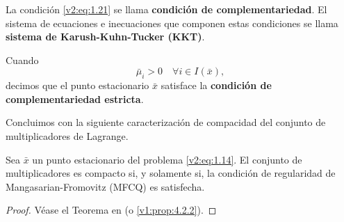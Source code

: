 La condición \eqref{v2:eq:1.21} se llama \textbf{condición de complementariedad}. El sistema de ecuaciones e inecuaciones que componen estas condiciones se llama \textbf{sistema de Karush-Kuhn-Tucker (KKT)}.

Cuando
\begin{equation}
    \bar{\mu}_i > 0 \quad \forall i \in I(\bar{x}),
    \label{v2:eq:1.25}
\end{equation}
decimos que el punto estacionario $\bar{x}$ satisface la \textbf{condición de complementariedad estricta}.

Concluimos con la siguiente caracterización de compacidad del conjunto de multiplicadores de Lagrange.

\begin{proposition}\label{v2:prop:1.2.1}
    Sea $\bar{x}$ un punto estacionario del problema \eqref{v2:eq:1.14}. El conjunto de multiplicadores es compacto si, y solamente si, la condición de regularidad de Mangasarian-Fromovitz (MFCQ) es satisfecha.
\end{proposition}

\begin{proof}
    Véase el Teorema en \cite{izmailov2020otimizacaovolume1} (o \cref{v1:prop:4.2.2}).
\end{proof}
